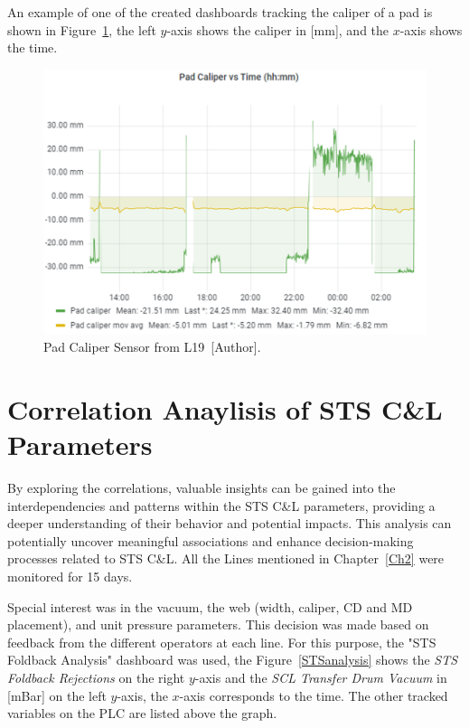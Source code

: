 An example of one of the created dashboards tracking the caliper of a pad is shown in Figure~\ref{dashboard1}, the left $y$-axis shows the caliper in [mm], and the $x$-axis shows the time.

\begin{figure}[H]
    \centering
    \includegraphics[width=1\linewidth, height=0.35\textheight]{FIGURES/dashb1.png}
    \caption{Pad Caliper Sensor from L19~[Author].}
    \label{dashboard1}
\end{figure}
\section{Correlation Anaylisis of STS C\&L Parameters}

By exploring the correlations, valuable insights can be gained into the interdependencies and patterns within the STS C\&L parameters, providing a deeper understanding of their behavior and potential impacts. This analysis can potentially uncover meaningful associations and enhance decision-making processes related to STS C\&L. All the Lines mentioned in Chapter~\ref{Ch2} were monitored for 15 days.

Special interest was in the vacuum, the web (width, caliper, CD and MD placement), and unit pressure parameters. This decision was made based on feedback from the different operators at each line. For this purpose, the "STS Foldback Analysis" dashboard was used, the Figure~\ref{STSanalysis} shows the \textit{STS Foldback Rejections} on the right $y$-axis and the \textit{SCL Transfer Drum Vacuum} in [mBar] on the left $y$-axis, the $x$-axis corresponds to the time. The other tracked variables on the PLC are listed above the graph.

